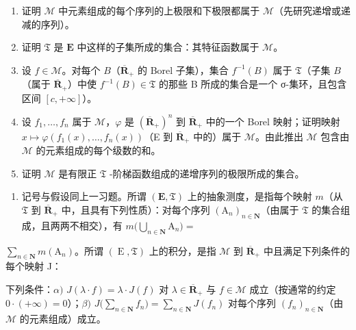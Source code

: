 \begin{enumerate}
\def\labelenumi{\alph{enumi})}
\item
  证明 \(\mathcal{M}\) 中元素组成的每个序列的上极限和下极限都属于 \(\mathcal{M}\)（先研究递增或递减的序列）。
\item
  证明 \(\mathfrak{T}\) 是 \(\mathbf{E}\) 中这样的子集所成的集合：其特征函数属于 \(\mathcal{M}\)。
\item
  设 \(f \in \mathcal{M}\)。对每个 \(B\)（\(\overline{\mathbf{R}}_+\) 的 Borel 子集），集合 \(f^{-1}(B)\) 属于 \(\mathfrak{T}\)（子集 \(B\)（属于 \(\overline{\mathbf{R}}_+\)）中使 \(f^{-1}(B) \in \mathfrak{T}\) 的那些 B 所成的集合是一个 σ-集环，且包含区间 \([c, +\infty]\)）。
\item
  设 \(f_1, \ldots, f_n\) 属于 \(\mathcal{M}\)，\(\varphi\) 是 \((\overline{\mathbf{R}}_+)^n\) 到 \(\overline{\mathbf{R}}_+\) 中的一个 Borel 映射；证明映射 \(x \mapsto \varphi(f_1(x), \ldots, f_n(x))\)（E 到 \(\overline{\mathbf{R}}_+\) 中的）属于 \(\mathcal{M}\)。由此推出 \(\mathcal{M}\) 包含由 \(\mathcal{M}\) 的元素组成的每个级数的和。
\item
  证明 \(\mathcal{M}\) 是有限正 \(\mathfrak{T}\) -阶梯函数组成的递增序列的极限所成的集合。
\end{enumerate}

\begin{enumerate}
\def\labelenumi{\arabic{enumi})}
\setcounter{enumi}{3}
\tightlist
\item
  记号与假设同上一习题。所谓 \((\mathbf{E},\mathfrak{T})\) 上的抽象测度，是指每个映射 \(m\)（从 \(\mathfrak{T}\) 到 \(\overline{\mathbf{R}}_+\) 中，且具有下列性质）：对每个序列 \((\mathrm{A}_n)_{n\in \mathbf{N}}\)（由属于 \(\mathfrak{T}\) 的集合组成，且两两不相交），有 \(m\big(\bigcup_{n\in \mathbf{N}}\mathrm{A}_n\big) =\)
\end{enumerate}

\(\sum_{n\in \mathbf{N}}m(\mathrm{A}_n)\)。所谓 \((\operatorname {E},\mathfrak{T})\) 上的积分，是指 \(\mathcal{M}\) 到 \(\overline{\mathbf{R}}_+\) 中且满足下列条件的每个映射 J：

  下列条件：\(\alpha)\) \(J(\lambda \cdot f) = \lambda \cdot J(f)\) 对 \(\lambda \in \overline{\mathbf{R}}_{+}\) 与 \(f \in \mathcal{M}\) 成立（按通常的约定 \(0 \cdot (+\infty) = 0\)）；\(\beta)\) \(J\big(\sum_{n \in \mathbf{N}} f_n\big) = \sum_{n \in \mathbf{N}} J(f_n)\) 对每个序列 \((f_n)_{n \in \mathbf{N}}\)（由 \(\mathcal{M}\) 的元素组成）成立。


